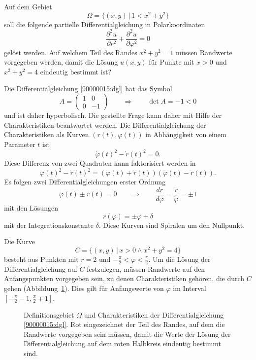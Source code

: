 Auf dem Gebiet
\[
\Omega = \{ (x,y)\,|\, 1 < x^2 + y^2\}
\]
soll die folgende partielle Differentialgleichung in Polarkoordinaten
\begin{equation}
\frac{\partial^2 u}{\partial r^2}
+
\frac{\partial^2 u}{\partial \varphi^2}
=
0
\label{90000015:dgl}
\end{equation}
gelöst werden.
Auf welchem Teil des Randes $x^2 +y^2 = 1$ müssen Randwerte vorgegeben
werden, damit die Lösung $u(x,y)$ für Punkte mit $x>0$ und $x^2 + y^2 = 4$
eindeutig bestimmt ist?

\begin{loesung}
Die Differentialgleichung \eqref{90000015:dgl} hat das Symbol
\[
A
=
\begin{pmatrix}
1&0\\
0&-1
\end{pmatrix}
\qquad\Rightarrow\qquad
\det A=-1<0
\]
und ist daher hyperbolisch.
Die gestellte Frage kann daher mit Hilfe der Charakteristiken beantwortet
werden.
Die Differentialgleichung der Charakteristiken als Kurven $(r(t),\varphi(t))$
in Abhängigkeit von einem Parameter $t$ ist
\[
\dot\varphi(t)^2 - \dot r(t)^2=0.
\]
Diese Differenz von zwei Quadraten kann faktorisiert werden in
\[
\dot\varphi(t)^2 - \dot r(t)^2
=
(\dot\varphi(t) + \dot r(t))
(\dot\varphi(t) - \dot r(t)).
\]
Es folgen zwei Differentialgleichungen erster Ordnung
\[
\dot\varphi(t)\pm\dot r(t) = 0
\qquad\Rightarrow\qquad
\frac{dr}{d\varphi}
=
\frac{\dot r}{\dot \varphi}
=
\pm 1
\]
mit den Lösungen
\[
r(\varphi) =  \pm \varphi + \delta
\]
mit der Integrationskonstante $\delta$.
Diese Kurven sind Spiralen um den Nullpunkt.

Die Kurve 
\[
C
=
\{ (x,y)\,|\, x>0\wedge x^2 +y^2=4\}
\]
besteht aus Punkten mit $r=2$ und $-\frac{\pi}{2}<\varphi<\frac{\pi}2$.
Um die Lösung der Differentialgleichung auf $C$ festzulegen, müssen
Randwerte auf den Anfangspunkten vorgegeben sein, zu denen Charakteristiken
gehören, die durch $C$ gehen (Abbildung~\ref{90000015:fig}).
Dies gilt für Anfangswerte von $\varphi$ im Interval
$[-\frac{\pi}2-1,\frac{\pi}2+1]$.
\begin{figure}
\centering
{}
\caption{Definitionsgebiet $\Omega$ und Charakteristiken der
Differentialgleichung \eqref{90000015:dgl}.
Rot eingezeichnet der Teil des Randes, auf dem die Randwerte vorgegeben
sein müssen, damit die Werte der Lösung der Differentialgleichung auf dem
roten Halbkreis eindeutig bestimmt sind.
\label{90000015:fig}}
\end{figure}
\end{loesung}


